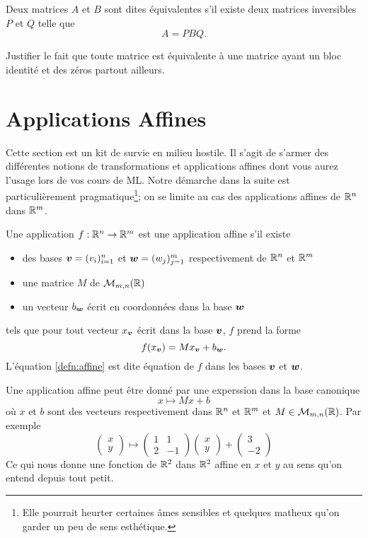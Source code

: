 \documentclass[11pt, a4paper]{article}
\begin{document}
\noindent Deux matrices $A$ et $B$ sont dites équivalentes s'il
existe deux matrices inversibles $P$ et $Q$ telle que
\[
A = PBQ.
\]
\begin{question}
  Justifier le fait que toute matrice est équivalente à une matrice
  ayant un bloc identité et des zéros partout ailleurs.
\end{question}


\section{Applications Affines}
\label{sec:defnappaffine}

Cette section est un kit de survie en milieu hostile. Il s'agit de
s'armer des différentes notions de transformations et applications
affines dont vous aurez l'usage lors de vos cours de ML. Notre
démarche dans la suite est particulièrement pragmatique\footnote{Elle
  pourrait heurter certaines âmes sensibles et quelques matheux qu'on
  garder un peu de sens esthétique.}; on se limite au cas des
applications affines de $\mathbb{R}^n$ dans $\mathbb{R}^m$.
\begin{defn}
  Une application $f : \mathbb{R}^n \to \mathbb{R}^m$ est une application affine s'il
  existe
  \begin{itemize}
  \item[\textbullet]
    des bases $\boldsymbol{v} = (v_i)_{i=1}^n$ et
    $\boldsymbol{w} = (w_j)_{j=1}^m$ respectivement de $\mathbb{R}^n$ et
    $\mathbb{R}^m$
  \item[\textbullet]
    une matrice $M$ de $\mathcal{M}_{m, n}(\mathbb{R})$
  \item[\textbullet]
    un vecteur $b_{\boldsymbol{w}}$ écrit en coordonnées dans la base $\boldsymbol{w}$
  \end{itemize}
  tels que pour tout vecteur $x_{\boldsymbol{v}}$ écrit dans la base $\boldsymbol{v}$,
  $f$ prend la forme
  \begin{equation}
    \label{defn:affine}
    f(x_{\boldsymbol{v}}) = Mx_{\boldsymbol{v}} + b_{\boldsymbol{w}}.
  \end{equation}
  L'équation \ref{defn:affine} est dite équation de $f$ dans les bases
  $\boldsymbol{v}$ et $\boldsymbol{w}$.
\end{defn}
\begin{exmp}
  Une application affine peut être donné par une experssion dans la
  base canonique
  \[
  x \mapsto Mx + b
  \]
  où $x$ et $b$ sont des vecteurs respectivement dans $\mathbb{R}^n$ et $\mathbb{R}^m$
  et $M \in \mathcal{M}_{m, n}(\mathbb{R})$. Par exemple
  \[
  \begin{pmatrix} x \\ y \end{pmatrix} \mapsto \begin{pmatrix} 1 & 1
    \\ 2 & -1 \end{pmatrix}\begin{pmatrix} x \\ y \end{pmatrix}
  + \begin{pmatrix} 3 \\ -2 \end{pmatrix}
  \]
  Ce qui nous donne une fonction de $\mathbb{R}^2$ dans $\mathbb{R}^2$ affine en $x$
  et $y$ au sens qu'on entend depuis tout petit.
\end{exmp}
\end{document}
